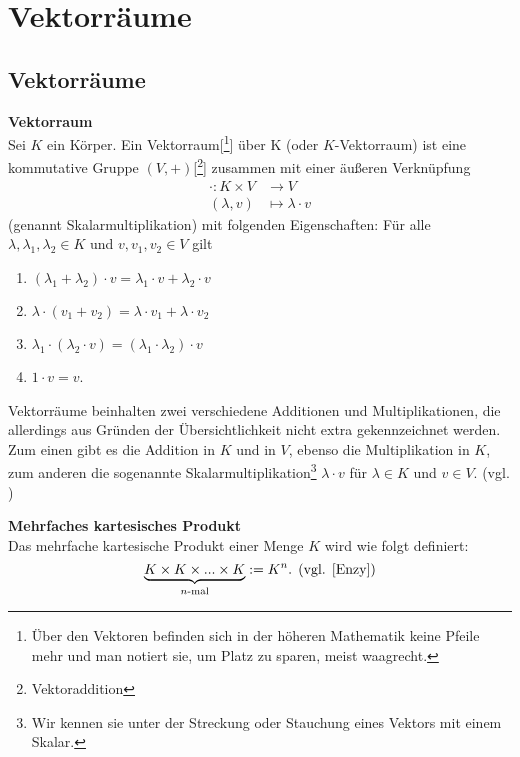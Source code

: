 \chapter{Vektorräume}
\label{sec:VR}

\section{Vektorräume}
\label{sec:Vektorräume}
\theoremstyle{definition}
\begin{definition}{\textbf{Vektorraum}}
\\{\glqq}Sei $K$ ein Körper. Ein Vektorraum[\footnote{Über den Vektoren befinden sich in der höheren Mathematik keine Pfeile mehr und man notiert sie, um Platz zu sparen, meist waagrecht.}] über K (oder $K$-Vektorraum) ist eine kommutative Gruppe $(V,+)$[\footnote{Vektoraddition}] zusammen mit einer äußeren Verknüpfung 
	\begin{align*}
	\cdot : K \times V &\rightarrow V
	\\ (\lambda,v) &\mapsto \lambda \cdot v
	\end{align*}
(genannt Skalarmultiplikation) mit folgenden Eigenschaften: Für alle $\lambda, \lambda_1, \lambda_2 \in K$ und $v, v_1, v_2 \in V$ gilt
	\begin{enumerate}
		\item $(\lambda_1 + \lambda_2) \cdot v = \lambda_1 \cdot v + 	\lambda_2 \cdot v $
		\item $ \lambda \cdot (v_1 + v_2) = \lambda \cdot v_1 + \lambda \cdot v_2$
		\item $\lambda_1 \cdot (\lambda_2 \cdot v) = (\lambda_1 \cdot \lambda_2) \cdot v$
		\item $ 1 \cdot v = v$.{\grqq} \cite[S. 28, 6.1]{Skript}
	\end{enumerate}
\end{definition}

\theoremstyle{bem}
\begin{bem}{}
Vektorräume beinhalten zwei verschiedene Additionen und Multiplikationen, die allerdings aus Gründen der Übersichtlichkeit nicht extra gekennzeichnet werden. Zum einen gibt es die Addition in $K$ und in $V$, ebenso die Multiplikation in $K$, zum anderen die sogenannte Skalarmultiplikation\footnote{Wir kennen sie unter der Streckung oder Stauchung eines Vektors mit einem Skalar.} \(\lambda \cdot v \) für $\lambda \in K$ und $v \in V$. (vgl. \cite[S. 28, 6.1]{Skript})
\end{bem}

\theoremstyle{definition}
\begin{definition}{\textbf{Mehrfaches kartesisches Produkt}}
\label{exampleVR}
	\\Das mehrfache kartesische Produkt einer Menge $K$ wird wie folgt definiert:
\[\underbrace{K \times K \times ... \times K}_{n\text{-mal}} := K^n \text{. (vgl. \cite[S. 28]{Enzy})}\]
\end{definition}

